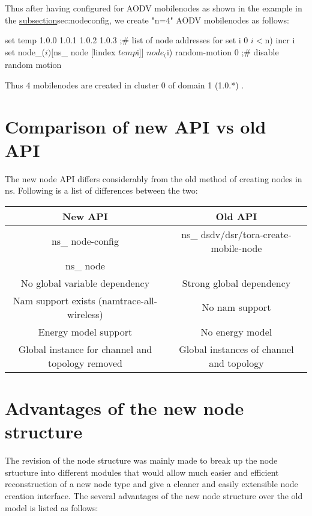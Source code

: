 Thus after having configured for AODV mobilenodes as shown in the example
in the \href{previous subsection}{subsection}{sec:nodeconfig}, we create
"n=4" AODV mobilenodes as follows:

\begin{program}
        set temp {1.0.0 1.0.1 1.0.2 1.0.3}   ;# list of node addresses
        for {set i 0} {$i < $n) } {incr i} {
                set node_($i) [$ns_ node [lindex $temp $i]]
                $node_($i) random-motion 0       ;# disable random motion
        }    
\end{program}

Thus 4 mobilenodes are created in cluster 0 of domain 1 (1.0.*) .
\clearpage

\section{Comparison of new API vs old API}
\label{sec:new-vs-old-api}

The new node API differs considerably from the old method of creating
nodes in ns. Following is a list of differences between the two:

\begin{table}[h]
\begin{center}
\begin{tabular}{|c|c|}\hline
{\bf New API} & {\bf Old API}\\\hline
ns\_ node-config & ns\_ dsdv/dsr/tora-create-mobile-node \\
ns\_ node & \\ \hline
No global variable dependency & Strong global dependency\\\hline
Nam support exists (namtrace-all-wireless) & No nam support\\\hline
Energy model support & No energy model\\\hline
Global instance for channel and topology removed & Global instances of
channel and topology\\\hline
\end{tabular}
\end{center}
\end{table}
\clearpage


\section{Advantages of the new node structure}
\label{sec:advan-newnode}

The revision of the node structure was mainly made to break up the node
srtucture into different modules that would allow much easier and
efficient reconstruction of a new node type and give a cleaner and easily
extensible node creation interface.
The several advantages of the new node structure over the old model is
listed as follows:

